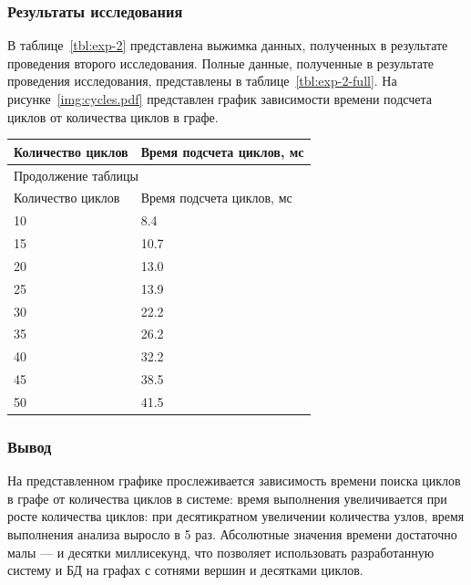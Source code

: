 \subsubsection{Результаты исследования}
В таблице~\ref{tbl:exp-2} представлена выжимка данных, полученных в результате 
проведения второго исследования. Полные данные, полученные в результате 
проведения исследования, представлены в таблице~\ref{tbl:exp-2-full}. 
На рисунке~\ref{img:cycles.pdf} представлен график зависимости 
времени подсчета циклов от количества циклов в графе.
\begin{center}
    \begin{tabularx}{\textwidth}{|X|X|}
        \caption{\label{tbl:exp-2}Результаты проведения второго исследования} \\
        \hline
        Количество циклов & Время подсчета циклов, мс \\ \hline
        \endfirsthead

        \multicolumn{2}{l}{{Продолжение таблицы\ \thetable{}}} \\ \hline
        Количество циклов & Время подсчета циклов, мс \\ \hline
        \endhead

        \hline
        \endfoot

        \hline
        \endlastfoot

        10 & 8.4 \\ \hline
        15 & 10.7 \\ \hline
        20 & 13.0 \\ \hline
        25 & 13.9 \\ \hline
        30 & 22.2 \\ \hline
        35 & 26.2 \\ \hline
        40 & 32.2 \\ \hline
        45 & 38.5 \\ \hline
        50 & 41.5 \\ \hline
    \end{tabularx}
\end{center}

\clearpage


\subsubsection{Вывод}
На представленном графике прослеживается зависимость времени поиска циклов 
в графе от количества циклов в системе: время выполнения 
увеличивается при росте количества циклов: при десятикратном увеличении 
количества узлов, время выполнения анализа выросло в 5 раз. Абсолютные 
значения времени достаточно малы --- и десятки миллисекунд, что 
позволяет использовать разработанную систему и БД на графах с сотнями вершин
и десятками циклов. 

